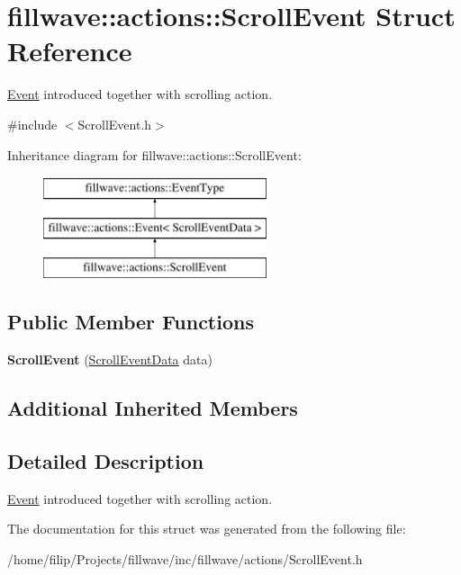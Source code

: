 \hypertarget{classfillwave_1_1actions_1_1ScrollEvent}{}\section{fillwave\+:\+:actions\+:\+:Scroll\+Event Struct Reference}
\label{classfillwave_1_1actions_1_1ScrollEvent}


\hyperlink{classfillwave_1_1actions_1_1Event}{Event} introduced together with scrolling action.  




{\ttfamily \#include $<$Scroll\+Event.\+h$>$}

Inheritance diagram for fillwave\+:\+:actions\+:\+:Scroll\+Event\+:\begin{figure}[H]
\begin{center}
\leavevmode
\includegraphics[height=3.000000cm]{classfillwave_1_1actions_1_1ScrollEvent}
\end{center}
\end{figure}
\subsection*{Public Member Functions}
\begin{DoxyCompactItemize}
\item 
\hypertarget{classfillwave_1_1actions_1_1ScrollEvent_a435f84e16ca05a8838660f20989f680c}{}{\bfseries Scroll\+Event} (\hyperlink{structfillwave_1_1actions_1_1ScrollEventData}{Scroll\+Event\+Data} data)\label{classfillwave_1_1actions_1_1ScrollEvent_a435f84e16ca05a8838660f20989f680c}

\end{DoxyCompactItemize}
\subsection*{Additional Inherited Members}


\subsection{Detailed Description}
\hyperlink{classfillwave_1_1actions_1_1Event}{Event} introduced together with scrolling action. 

The documentation for this struct was generated from the following file\+:\begin{DoxyCompactItemize}
\item 
/home/filip/\+Projects/fillwave/inc/fillwave/actions/Scroll\+Event.\+h\end{DoxyCompactItemize}
